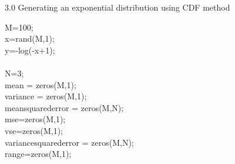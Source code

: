 \documentclass[twoside,twocolumn]{article}
\begin{document}
\begin{large}
3.0 Generating an exponential distribution using CDF method
\end{large}
\newline
\begin{itshape}
M=100;\\
x=rand(M,1);\\
y=-log(-x+1);\\
\\
N=3;\\
mean = zeros(M,1);\\
variance = zeros(M,1);\\
meansquarederror = zeros(M,N);\\
mse=zeros(M,1);\\
vse=zeros(M,1);\\
variancesquarederror = zeros(M,N);\\
range=zeros(M,1);\\


\end{itshape}
\end{document}

